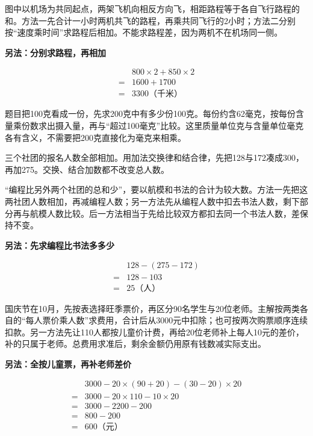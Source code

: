 \documentclass[multi=snippet,border=0pt]{standalone}
\newenvironment{snippet}[3]{\begin{minipage}{#1bp}\color{answerred}\fontsize{#2}{#3}\selectfont\raggedright}{\end{minipage}}
\begin{document}
\begin{snippet}{505}{11.5}{14}图中以机场为共同起点，两架飞机向相反方向飞，相距路程等于各自飞行路程的和。方法一先合计一小时两机共飞的路程，再乘共同飞行的2小时；方法二分别按“速度乘时间”求路程后相加。不能求路程差，因为两机不在机场同一侧。\par \textbf{另法：分别求路程，再相加}\par \[\begin{aligned}&800\times2+850\times2\\={}&1600+1700\\={}&3300\text{（千米）}\end{aligned}\]\end{snippet}
\begin{snippet}{505}{11.5}{14}题目把100克看成一份，先求200克中有多少份100克。每份约含62毫克，按每份含量乘份数求出摄入量，再与“超过100毫克”比较。这里质量单位克与含量单位毫克各有含义，不需要把200克直接化为毫克来相乘。\end{snippet}
\begin{snippet}{505}{11.5}{14}三个社团的报名人数全部相加。用加法交换律和结合律，先把128与172凑成300，再加275。交换、结合加数都不改变总人数。\end{snippet}
\begin{snippet}{505}{11.5}{14}“编程比另外两个社团的总和少”，要以航模和书法的合计为较大数。方法一先把这两社团人数相加，再减编程人数；另一方法先从编程人数中扣去书法人数，剩下部分再与航模人数比较。后一方法相当于先给比较双方都扣去同一个书法人数，差保持不变。\par \textbf{另法：先求编程比书法多多少}\par \[\begin{aligned}&128-(275-172)\\={}&128-103\\={}&25\text{（人）}\end{aligned}\]\end{snippet}
\begin{snippet}{505}{11.5}{14}国庆节在10月，先按表选择旺季票价，再区分90名学生与20位老师。主解按两类各自的“每人票价乘人数”求费用，合计后从3000元中扣除；也可按两次购票顺序连续扣款。另一方法先让110人都按儿童价计费，再给20位老师补上每人10元的差价，补的只属于老师。总费用求准后，剩余金额仍用原有钱数减实际支出。\par \textbf{另法：全按儿童票，再补老师差价}\par \[\begin{aligned}&3000-20\times(90+20)-(30-20)\times20\\={}&3000-20\times110-10\times20\\={}&3000-2200-200\\={}&800-200\\={}&600\text{（元）}\end{aligned}\]\end{snippet}
\end{document}

